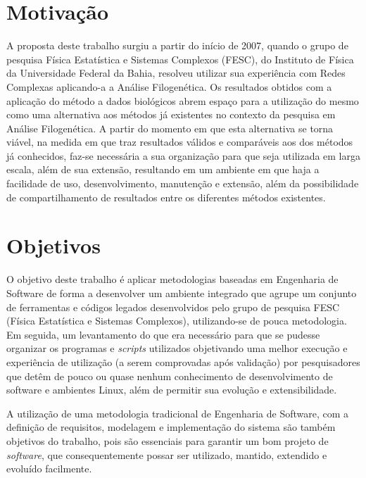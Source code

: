 \section{Motivação}

A proposta deste trabalho surgiu a partir do início de 2007, quando o grupo de pesquisa Física Estatística e Sistemas Complexos (FESC),
do Instituto de Física da Universidade Federal da Bahia, resolveu utilizar sua experiência com Redes Complexas aplicando-a a Análise Filogenética.
Os resultados obtidos com a aplicação do método a dados biológicos abrem espaço para a utilização do mesmo como uma alternativa aos métodos
já existentes no contexto da pesquisa em Análise Filogenética. A partir do momento em que esta alternativa se torna viável, na medida em que traz resultados
válidos e comparáveis aos dos métodos já conhecidos,
faz-se necessária a sua organização para que seja utilizada em larga escala, além de sua extensão,
resultando em um ambiente em que haja a facilidade de uso, desenvolvimento, manutenção e extensão, além da possibilidade de compartilhamento de
resultados entre os diferentes métodos existentes.

\section{Objetivos} \label{sec:objetivos}

O objetivo deste trabalho é aplicar metodologias baseadas em Engenharia de Software de forma a desenvolver um ambiente integrado que agrupe
um conjunto de ferramentas e códigos legados desenvolvidos pelo grupo de pesquisa FESC (Física Estatística e Sistemas Complexos),
utilizando-se de pouca metodologia. Em seguida, um levantamento do que era necessário para que
se pudesse organizar os programas e \textit{scripts} utilizados objetivando uma melhor execução e experiência de utilização (a serem comprovadas após validação)
 por pesquisadores que detêm de
pouco ou quase nenhum conhecimento de desenvolvimento de software e ambientes Linux, além de permitir sua evolução e extensibilidade.

A utilização de uma metodologia tradicional de Engenharia de Software, com a definição de requisitos, modelagem e implementação do sistema são também
objetivos do trabalho, pois são
essenciais para garantir um bom projeto de \textit{software}, que consequentemente possar ser utilizado, mantido, extendido
e evoluído facilmente.


